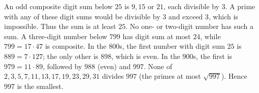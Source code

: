 An odd composite digit sum below $25$ is $9,15$ or $21$, each divisible by $3$. A prime with any of these digit sums would be divisible by $3$ and exceed $3$, which is impossible. Thus the sum is at least $25$. No one- or two-digit number has such a sum. A three-digit number below $799$ has digit sum at most $24$, while $799=17\cdot47$ is composite. In the $800$s, the first number with digit sum $25$ is $889=7\cdot127$; the only other is $898$, which is even. In the $900$s, the first is $979=11\cdot89$, followed by $988$ (even) and $997$. None of $2,3,5,7,11,13,17,19,23,29,31$ divides $997$ (the primes at most $\sqrt{997}$). Hence $\boxed{997}$ is the smallest.
